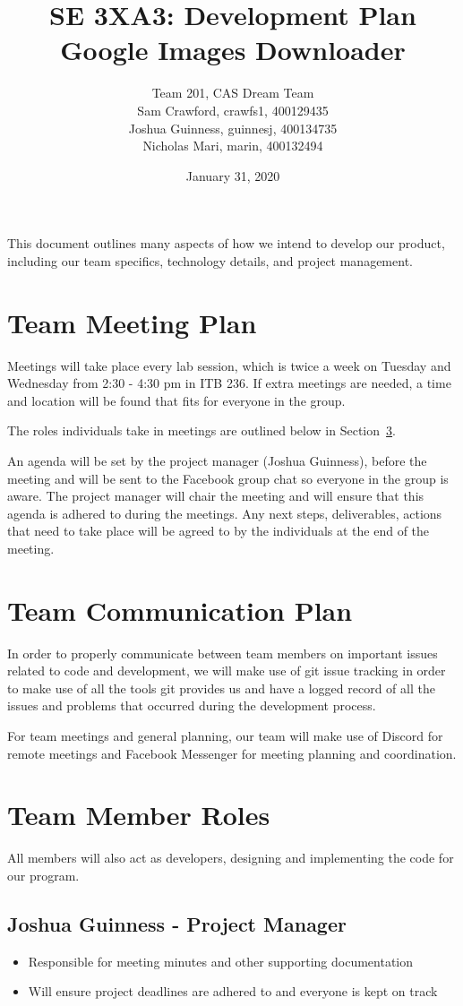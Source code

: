 \documentclass{article}
\title{SE 3XA3: Development Plan\\Google Images Downloader}
\author{Team 201, CAS Dream Team
		\\ Sam Crawford, crawfs1, 400129435
		\\ Joshua Guinness, guinnesj, 400134735
		\\ Nicholas Mari, marin, 400132494
}
\date{January 31, 2020}
\begin{document}
\maketitle

This document outlines many aspects of how we intend to develop our product, 
including our team specifics, technology details, and project management.

\section{Team Meeting Plan}
Meetings will take place every lab session, which is twice a week on Tuesday and 
Wednesday from 2:30 - 4:30 pm in ITB 236. If extra meetings are needed, a time 
and location will be found that fits for everyone in the group.

The roles individuals take in meetings are outlined below in Section~\ref{roles}. 

An agenda will be set by the project manager (Joshua Guinness), before the 
meeting and will be sent to the Facebook group chat so everyone in the group is 
aware. The project manager will chair the meeting and will ensure that this 
agenda is adhered to during the meetings. Any next steps, deliverables, actions 
that need to take place will be agreed to by the individuals at the end of the meeting. 

\section{Team Communication Plan}
In order to properly communicate between team members on important issues 
related to code and development, we will make use of git issue tracking in order 
to make use of all the tools git provides us and have a logged record of all the 
issues and problems that occurred during the development process.

For team meetings and general planning, our team will make use of Discord for 
remote meetings and Facebook Messenger for meeting planning and coordination.

\section{Team Member Roles}
\label{roles}
All members will also act as developers, designing and implementing the code for 
our program.

\subsection{Joshua Guinness - Project Manager}
\begin{itemize}
\item Responsible for meeting minutes and other supporting documentation
\item Will ensure project deadlines are adhered to and everyone is kept on track
\end{itemize}
\end{document}
